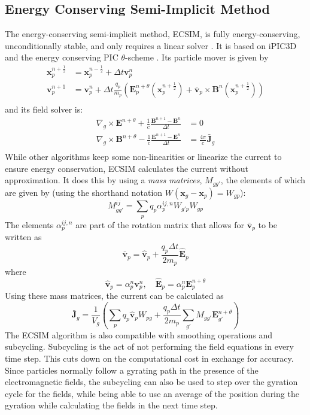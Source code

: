 \subsection{Energy Conserving Semi-Implicit Method}
\label{subsec: plasma intro ECSIM}
The energy-conserving semi-implicit method, ECSIM, is fully energy-conserving, unconditionally stable, and only requires a linear solver \cite{lapenta_exactly_2017}. It is based on iPIC3D \cite{markidis_multi-scale_2010} and the energy conserving PIC $\theta$-scheme \cite{brackbill_implicit_1982}. Its particle mover is given by 
\begin{align*}
	\textbf{x}_p^{n+\frac{1}{2}} &= \textbf{x}_p^{n-\frac{1}{2}} + \Delta t \textbf{v}_p^{n} \\
	\textbf{v}_p^{n+1} &= \textbf{v}_p^{n} + \Delta t \frac{q_p}{m_p}\left(\textbf{E}^{n+\theta}_p(\textbf{x}_p^{n+\frac{1}{2}}) + \bar{\textbf{v}}_p \times \textbf{B}^n(\textbf{x}_p^{n+\frac{1}{2}})\right)\\
\end{align*}
and its field solver is: 
   \begin{align*}
 	\nabla_g \times \mathbf{E}^{n + \theta} +\frac{1}{c}\frac{\mathbf{B}^{n+1} - \mathbf{B}^{n}}{\Delta t} &= 0 \\
 	\nabla_g \times \mathbf{B}^{n+ \theta} -\frac{1}{c}\frac{\mathbf{E}^{n+1} - \mathbf{E}^{n}}{\Delta t} &= \frac{4 \pi}{c}\bar{\mathbf{J}}_g\\
 \end{align*}
 While other algorithms keep some non-linearities or linearize the current to ensure energy conservation, ECSIM calculates the current without approximation. It does this by using a \textit{mass matrices}, $M_{gg'}$, the elements of which are given by (using the shorthand notation $W(\textbf{x}_g- \textbf{x}_p)= W_{gp}$): \[
 M^{ij}_{g g'} = \sum_p q_p \alpha_p^{ij,n} W_{g'p} W_{gp}\]
 The elements $\alpha_p^{ij,n}$ are part of the rotation matrix that allows for $\bar{\textbf{v}}_p$ to be written as \[\bar{\textbf{v}}_p = \hat{\textbf{v}}_p + \frac{q_p \Delta t}{2 m_p}\hat{\textbf{E}}_p\]
 where 
 \[ \hat{\textbf{v}}_p = \alpha^n_p \textbf{v}_p^n, \quad \hat{\textbf{E}}_p = \alpha^n_p \textbf{E}_p^{n+\theta}
 \]
 Using these mass matrices, the current can be calculated as 
 \[\bar{\textbf{J}}_g = \frac{1}{V_g}\left(\sum_p q_p \hat{\textbf{v}}_p W_{pg} + \frac{q_p \Delta t}{2 m_p}\sum_{g'}M_{g g'} \textbf{E}^{n+\theta}_{g'}\right)\]
The ECSIM algorithm is also compatible with smoothing operations and subcycling. Subcycling is the act of not performing the field equations in every time step. This cuts down on the computational cost in exchange for accuracy. Since particles normally follow a gyrating path in the presence of the electromagnetic fields, the subcycling can also be used to step over the gyration cycle for the fields, while being able to use an average of the position during the gyration while calculating the fields in the next time step.
\color{black}


